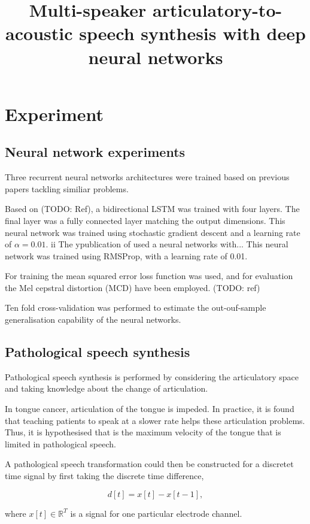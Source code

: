 \message{ !name(template.tex)}\documentclass[a4paper]{article}
\title{Multi-speaker articulatory-to-acoustic speech synthesis with
deep neural networks}
\begin{document}
\section{Experiment}

\subsection{Neural network experiments}

Three recurrent neural networks architectures were trained based on previous
papers tackling similiar problems.

Based on (TODO: Ref), a bidirectional LSTM was trained with four layers.
The final layer was a fully connected layer matching the output dimensions.
This neural network was trained using stochastic gradient descent and
a learning rate of \( \alpha = 0.01 \).
ii
The ypublication of \cite{Taguchi} used a neural networks with...
This neural network was trained using RMSProp, with a learning rate of 0.01.

For training the mean squared error loss function was used, and for
evaluation the Mel cepstral distortion (MCD) have been employed. (TODO: ref)


Ten fold cross-validation was performed to estimate the out-ouf-sample
generalisation capability of the neural networks.

\subsection{Pathological speech synthesis}

Pathological speech synthesis is performed by considering the articulatory
space and taking knowledge about the change of articulation.

In tongue cancer, articulation of the tongue is impeded. In practice,
it is found that teaching patients to speak at a slower rate helps these
articulation problems. Thus, it is hypothesised that is the maximum
velocity of the tongue that is limited in pathological speech.

A pathological speech transformation could then be constructed for
a discretet time signal by first taking the discrete time difference,

\begin{equation}
  d[t] = x[t] - x[t-1],
  \label{eq1}
\end{equation}

where \( x[t] \in \mathbb{R}^T \) is a signal for one particular electrode channel.
\end{document}
